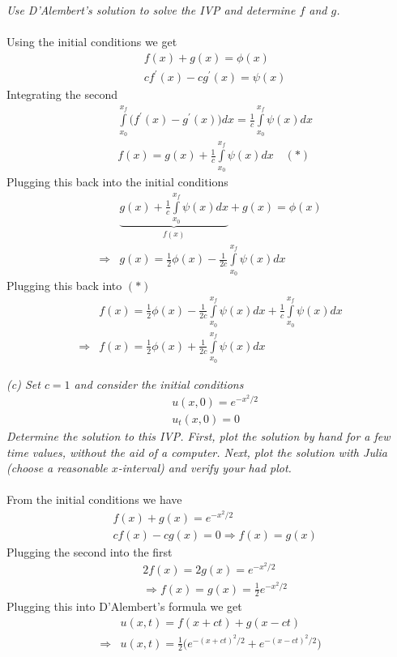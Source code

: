 \documentclass[12pt]{article}
\theoremstyle{remark}
\begin{document}
\textit{Use D'Alembert's solution to solve the IVP and determine $f$ and $g$.} \\ \\
Using the initial conditions we get
\begin{align*}
& f(x) + g(x) = \phi (x) \\
& cf^\prime (x) - cg^\prime(x) = \psi (x) 
\end{align*}
Integrating the second 
\begin{align*}
& \int\limits_{x_0}^{x_f} \bigg(f^\prime(x) - g^\prime(x)\bigg) dx = \frac{1}{c}\int\limits_{x_0}^{x_f} \psi(x) dx \\
& f(x) = g(x) + \frac{1}{c}\int\limits_{x_0}^{x_f} \psi(x) dx \quad (*)
\end{align*}
Plugging this back into the initial conditions
\begin{align*}
& \underbrace{g(x) + \frac{1}{c}\int\limits_{x_0}^{x_f} \psi(x) dx}_{f(x)} + g(x) = \phi(x) \\
\Rightarrow & \boxed{g(x) = \frac{1}{2}\phi(x) - \frac{1}{2c}\int\limits_{x_0}^{x_f} \psi(x) dx}
\end{align*}
Plugging this back into $(*)$
\begin{align*}
& f(x) = \frac{1}{2}\phi(x) - \frac{1}{2c}\int\limits_{x_0}^{x_f} \psi(x) dx + \frac{1}{c}\int\limits_{x_0}^{x_f} \psi(x) dx \\
\Rightarrow & \boxed{f(x) = \frac{1}{2}\phi(x) + \frac{1}{2c}\int\limits_{x_0}^{x_f} \psi(x) dx}
\end{align*}

\newpage

\noindent \textit{(c) Set $c=1$ and consider the initial conditions}
\begin{align*}
& u(x,0) = e^{-x^2/2} \\
& u_t(x,0) = 0
\end{align*}
\textit{Determine the solution to this IVP. First, plot the solution by hand for a few time values, without the aid of a computer. Next, plot the solution with Julia (choose a reasonable $x$-interval) and verify your had plot.} \\ \\
From the initial conditions we have
\begin{align*}
& f(x) + g(x) = e^{-x^2/2} \\
& cf(x) - cg(x) = 0 \Rightarrow f(x) = g(x)
\end{align*}
Plugging the second into the first
\begin{align*}
& 2f(x) = 2g(x) = e^{-x^2/2} \\
& \Rightarrow f(x) = g(x) = \frac{1}{2}e^{-x^2/2}
\end{align*}
Plugging this into D'Alembert's formula we get
\begin{align*}
& u(x,t) = f(x+ct) + g(x-ct) \\
\Rightarrow & \boxed{u(x,t) = \frac{1}{2}\bigg(e^{-(x+ct)^2/2}  + e^{-(x-ct)^2/2}\bigg)}
\end{align*}
\end{document}
